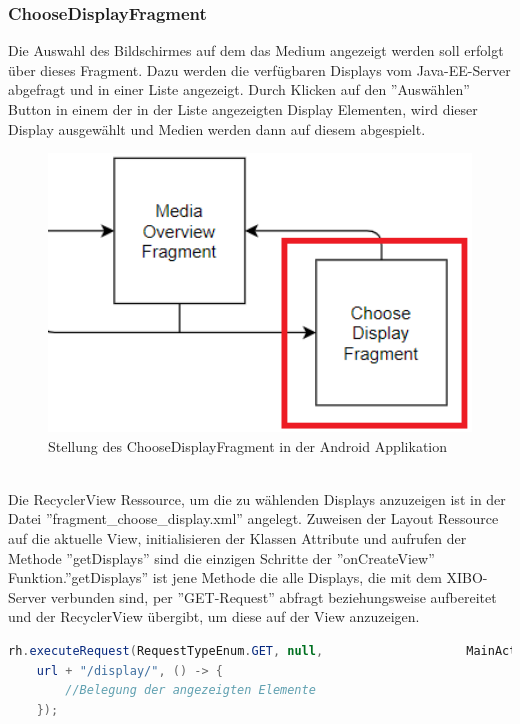 \subsubsection{ChooseDisplayFragment}
Die Auswahl des Bildschirmes auf dem das Medium angezeigt werden soll erfolgt über dieses Fragment. Dazu werden die verfügbaren Displays vom Java-EE-Server abgefragt und in einer Liste angezeigt. Durch Klicken auf den ''Auswählen'' Button in einem der in der Liste angezeigten Display Elementen, wird dieser Display ausgewählt und Medien werden dann auf diesem abgespielt. 
\\
\begin{figure}[H]
\centering
\includegraphics[width=1.0\textwidth]{images/06_AndroidApp/06_ChooseDisplayStellung}
\caption{Stellung des ChooseDisplayFragment in der Android Applikation}
\label{fig:mediaNav}
\end{figure}
\\
Die RecyclerView Ressource, um die zu wählenden Displays anzuzeigen ist in der Datei ''fragment\_choose\_display.xml'' angelegt. Zuweisen der Layout Ressource auf die aktuelle View, initialisieren der Klassen Attribute und aufrufen der Methode ''getDisplays'' sind die einzigen Schritte der ''onCreateView'' Funktion.''getDisplays'' ist jene Methode die alle Displays, die mit dem XIBO-Server verbunden sind, per ''GET-Request'' abfragt beziehungsweise aufbereitet und der RecyclerView übergibt, um diese auf der View anzuzeigen. 
\begin{lstlisting}[language=Java,caption={Abfragen und anzeigen der Displays im ChooseDisplayFragment}]
rh.executeRequest(RequestTypeEnum.GET, null,					MainActivityBottomNavigation.getInstance().
	url + "/display/", () -> {
		//Belegung der angezeigten Elemente
	});
\end{lstlisting}

